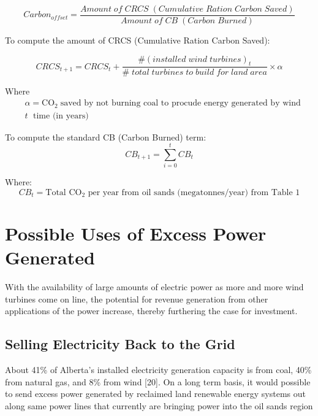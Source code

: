 \documentclass[12pt]{article}
\begin{document}
\begin{displaymath}
Carbon_{offset} = \frac{Amount \;of\; CRCS \;(Cumulative \;Ration \;Carbon \;Saved)}{Amount \;of \;CB \;(Carbon\; Burned)}
\end{displaymath}

To compute the amount of CRCS (Cumulative Ration Carbon Saved):

\begin{displaymath}
CRCS_{t+1} = CRCS_t + \frac{\# (installed \;wind\; turbines)_t}{\# \;total \; turbines \; to\; build \; for \; land \; area} \times \alpha
\end{displaymath}

Where
\begin{displaymath}
\begin{split}
& \alpha =  \text{CO}_2 \;\text{saved by not burning coal to procude energy generated by wind}\\
& t \; \text{ time (in years)}
\end{split}
\end{displaymath}

To compute the standard CB (Carbon Burned) term: 
\begin{displaymath}
CB_{t+1} = \sum_{i=0}^{t} CB_t
\end{displaymath}

Where:
\begin{displaymath}
CB_t = \text{Total CO$_2$ per year from oil sands (megatonnes/year) from Table 1}
\end{displaymath}

\section{Possible Uses of Excess Power Generated}

With the availability of large amounts of electric power as more and more wind turbines come on line, the potential for revenue generation from other applications of the power increase, thereby furthering the case for investment.

\subsection{Selling Electricity Back to the Grid}

About 41\% of Alberta’s installed electricity generation capacity is from coal, 40\% from natural gas, and 8\% from wind [20]. On a long term basis, it would possible to send excess power generated by reclaimed land renewable energy systems out along same power lines that currently are bringing power into the oil sands region
\end{document}
